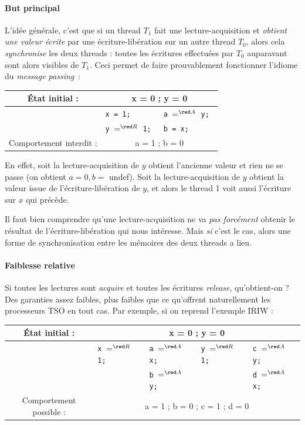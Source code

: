 \paragraph{But principal} L'idée générale, c'est que si un thread $T_1$ fait une
lecture-acquisition et \emph{obtient une valeur écrite} par une écriture-libération sur
un autre thread $T_0$, alors cela \emph{synchronise} les deux threads : toutes
les écritures effectuées par $T_0$ auparavant sont alors visibles de $T_1$. Ceci
permet de faire prouvablement fonctionner l'idiome du \emph{message passing}~:
\begin{center}
\begin{tabular}{|c|p{2cm}||p{2cm}|}
  \hline
  État initial : & \multicolumn{2}{c|}{x = 0 ; y = 0} \\
  \hline
  & \tt x = 1;           & \tt a $=^{\red A}$ y; \\
  & \tt y $=^{\red R}$ 1; & \tt b = x; \\
  \hline
  Comportement interdit : & \multicolumn{2}{c|}{a = 1 ; b = 0} \\
  \hline
\end{tabular}
\end{center}

En effet, soit la lecture-acquisition de $y$ obtient l'ancienne valeur et rien
ne se passe (on obtient $a = 0, b = $ undef). Soit la lecture-acquisition de $y$
obtient la valeur issue de l'écriture-libération de $y$, et alors le thread 1
\og voit\fg{} aussi l'écriture sur $x$ qui précède.


Il faut bien comprendre qu'une lecture-acquisition ne va \emph{pas forcément}
obtenir le résultat de l'écriture-libération qui nous intéresse. Mais \emph{si}
c'est le cas, alors une forme de synchronisation entre les mémoires des deux
threads a lieu.


\paragraph{Faiblesse relative} Si toutes les lectures sont \emph{acquire} et
toutes les écritures \emph{release}, qu'obtient-on ? Des garanties assez
faibles, plus faibles que ce qu'offrent naturellement les processeurs TSO en
tout cas. Par exemple, si on reprend l'exemple IRIW :

\begin{center}
\begin{tabular}{|c|p{2cm}||p{2cm}||p{2cm}||p{2cm}|}
  \hline
  État initial : & \multicolumn{4}{c|}{x = 0 ; y = 0} \\
  \hline
  & \tt x $=^{\red R}$ 1; & \tt a $=^{\red A}$ x; & \tt y $=^{\red R}$ 1; & \tt c $=^{\red A}$ y; \\
  & \tt                  & \tt b $=^{\red A}$ y; &                      & \tt d $=^{\red A}$ x; \\
  \hline
  Comportement possible : & \multicolumn{4}{c|}{a = 1 ; b = 0 ; c = 1 ; d = 0} \\
  \hline
\end{tabular}
\end{center}

